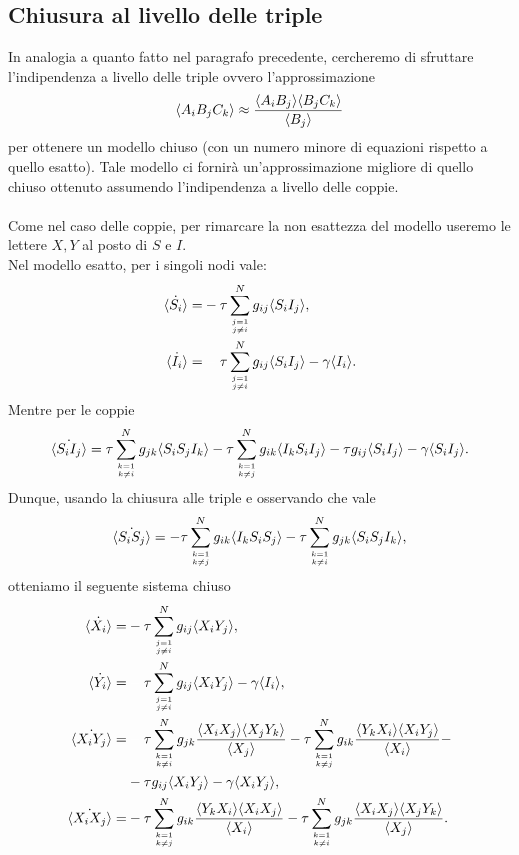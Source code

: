 \subsection{Chiusura al livello delle triple}
In analogia a quanto fatto nel paragrafo precedente, cercheremo di sfruttare l'indipendenza a livello delle triple ovvero l'approssimazione
$$ \langle  A_i B_j C_k  \rangle\approx \frac{\langle A_iB_j \rangle\langle B_jC_k \rangle}{\langle B_j \rangle}$$
 per ottenere un modello chiuso (con un numero minore di equazioni rispetto a quello esatto). Tale modello ci fornir\`a  un'approssimazione migliore di quello chiuso ottenuto assumendo l'indipendenza a livello delle coppie.\\ \\
Come nel caso delle coppie, per rimarcare la non esattezza del modello useremo le lettere $X,Y$ al posto di $S$ e $I$. \\
Nel  modello esatto, per i singoli nodi vale: \begin{equation*}
\begin{aligned}
	\dot{\angol{S_i}} = &-\tau \sum_{j=1\atop {j\neq i }} ^N g_{ij} \angol{S_i I_j},\\
	\dot{\angol{I_i}} = &\spa\tau \sum_{j=1\atop {j\neq i }} ^N g_{ij} \angol{S_i I_j} -\gamma \angol{I_i}.
\end{aligned}
\end{equation*}
Mentre per le coppie 
$$
\dot{\langle S_i I_j \rangle} = \tau \sum_{k=1\atop{k\neq i }}^N g_{jk} \langle S_iS_jI_k \rangle - \tau \sum_{k=1\atop{k\neq j }}^N g_{ik} \langle I_kS_iI_j \rangle - \tau  g_{ij} \langle S_i I_j \rangle  -\gamma \langle S_i I_j \rangle.
$$
Dunque, usando la chiusura alle triple e osservando che vale
$$ \dot{\langle S_i S_j \rangle} = -\tau \sum_{k=1\atop{k \neq j}}^N g_{ik} \langle I_kS_iS_j \rangle - \tau \sum_{k=1\atop{k\neq i }}^N g_{jk} \langle S_iS_jI_k \rangle,$$ 
otteniamo il seguente sistema chiuso 
\begin{equation}\label{Chiuso_triple}
\begin{aligned}
		\dot{\angol{X_i}} = &-\tau \sum_{j=1\atop {j\neq i }} ^N g_{ij} \angol{X_i Y_j},\\
	\dot{\angol{Y_i}} = &\spa\tau \sum_{j=1\atop {j\neq i }} ^N g_{ij} \angol{X_i Y_j} -\gamma \angol{I_i}, \\
\dot{\angol{X_i Y_j}} =& \spa \tau \sum_{k=1\atop{k\neq i }}^N g_{jk} \frac{\angol{X_iX_j}\angol{X_jY_k}}{\angol{X_j}} - \tau \sum_{k=1\atop{k\neq j }}^N g_{ik} \frac{\angol{Y_kX_i}\angol{X_iY_j}}{\angol{X_i}}- \\
&-\tau  g_{ij} \angol{X_i Y_j}  -\gamma \angol{X_i Y_j},\\
\dot{\angol{X_i X_j}} = &-\tau \sum_{k=1\atop{k \neq j}}^N g_{ik} \frac{\angol{Y_kX_i}\angol{X_iX_j}}{\angol{X_i}} - \tau \sum_{k=1\atop{k\neq i }}^N g_{jk} \frac{\angol{X_iX_j}\angol{X_jY_k}}{\angol{X_j}}.
\end{aligned}
\end{equation} 
